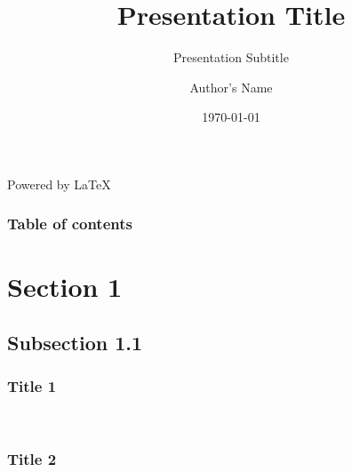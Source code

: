\documentclass[aspectratio=169]{beamer}
\begin{document}
\title{Presentation Title}
\subtitle{Presentation Subtitle}
\author{Author's Name}
\date{\today}

{
\begin{frame}[plain]
  \begin{minipage}{0.48\paperwidth}
    \vspace*{8.5cm}\hspace*{0.6cm}\tiny Powered by \LaTeX%
  \end{minipage}%
  \begin{minipage}{0.42\paperwidth}
    \vspace*{3.1cm}\titlepage%
  \end{minipage}
\end{frame}
}

\begin{frame}[plain]
  \frametitle{Table of contents}
  \tableofcontents
\end{frame}


\section{Section 1} 
  \subsection{Subsection 1.1}
  \begin{frame}[foot]
    \frametitle{Title 1} 
    \lipsum[1]~\cite{articleExample}
  \end{frame}

  \begin{frame}
    \frametitle{Title 2} 
    \lipsum[2]
  \end{frame}
\end{document}
